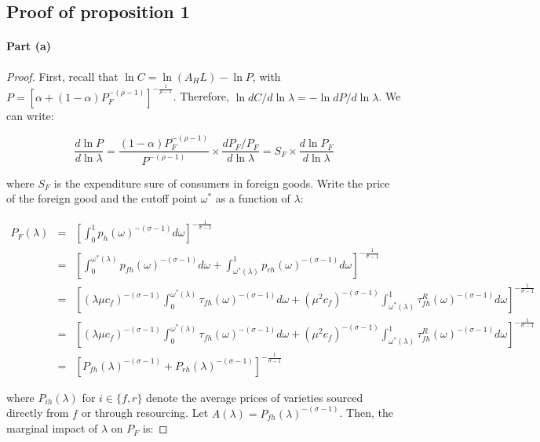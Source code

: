 
\subsection{Proof of proposition 1}\label{sec:proof-1}

\paragraph{Part (a)}

\begin{proof}

First, recall that $\ln C = \ln (A_H L) - \ln P$, with $P = [\alpha + (1-\alpha) P_F^{-(\rho-1)}]^{-\frac{1}{\rho-1}}$. Therefore,  $\ln dC/d \ln \lambda = - \ln dP/d \ln \lambda$. We can write:

\begin{equation*}
    \frac{d \ln P}{d \ln \lambda} = \frac{(1-\alpha) P_F^{-(\rho-1)}}{P^{-(\rho-1)}} \times \frac{d P_F / P_F}{d \ln \lambda} = S_F \times \frac{d \ln P_F}{d \ln \lambda} 
\end{equation*}

\noindent where $S_F$ is the expenditure sure of consumers in foreign goods. Write the price of the foreign good and the cutoff point $\omega^*$ as a function of $\lambda$:

\begin{eqnarray*}
    P_F(\lambda) &=&  \left[\int_0^1 p_{h}(\omega)^{-(\sigma-1)}d\omega \right]^{-\frac{1}{\sigma-1}} \\
    &=& \left[\int_0^{\omega^*(\lambda)} p_{fh}(\omega)^{-(\sigma-1)}d\omega + \int_{\omega^*(\lambda)}^1 p_{rh}(\omega)^{-(\sigma-1)}d\omega \right]^{-\frac{1}{\sigma-1}} \\
    &=& \left[ (\lambda \mu c_f)^{-(\sigma-1)} \int_0^{\omega^*(\lambda)} \tau_{fh}(\omega)^{-(\sigma-1)}d\omega + (\mu^2 c_f)^{-(\sigma-1)}\int_{\omega^*(\lambda)}^1 \tau_{fh}^R(\omega)^{-(\sigma-1)}d\omega \right]^{-\frac{1}{\sigma-1}} \\    
    &=& \left[ (\lambda \mu c_f)^{-(\sigma-1)} \int_0^{\omega^*(\lambda)} \tau_{fh}(\omega)^{-(\sigma-1)}d\omega + (\mu^2 c_f)^{-(\sigma-1)}\int_{\omega^*(\lambda)}^1 \tau_{fh}^R(\omega)^{-(\sigma-1)}d\omega \right]^{-\frac{1}{\sigma-1}} \\    
    &=& \left[ P_{fh}(\lambda)^{-(\sigma-1)} + P_{rh}(\lambda)^{-(\sigma-1)} \right]^{-\frac{1}{\sigma-1}} 
\end{eqnarray*}

\noindent where $P_{ih}(\lambda)$ for $i \in \{f,r\}$ denote the average prices of varieties sourced directly from $f$ or through resourcing. Let $A(\lambda)=P_{fh}(\lambda)^{-(\sigma-1)}$. Then, the marginal impact of $\lambda$ on $P_F$ is:


\end{proof}
